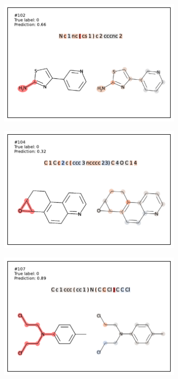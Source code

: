 \begin{figure}
\begin{subfigure}[b]{0.33\textwidth}
\end{subfigure}\begin{subfigure}[b]{0.33\textwidth} 
  \centering 
  \includegraphics[width=\textwidth]{figures/ames/ames102.pdf} 
\end{subfigure} 
\begin{subfigure}[b]{0.33\textwidth} 
  \centering 
  \includegraphics[width=\textwidth]{figures/ames/ames104.pdf} 
\end{subfigure}\begin{subfigure}[b]{0.33\textwidth} 
  \centering 
  \includegraphics[width=\textwidth]{figures/ames/ames107.pdf} 

\end{subfigure}
\end{figure}
